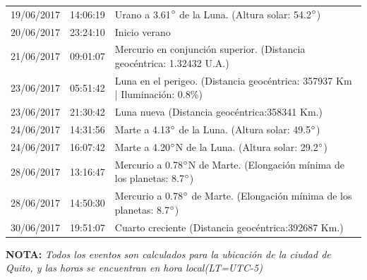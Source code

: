 \documentclass[12pt,a4paper,oneside]{article}
\begin{document}
\begin{center}
\begin{tabular}{ |l| l| l| }
19/06/2017& 14:06:19 &	Urano a 3.61$\degree $ de la Luna. (Altura solar: 54.2$\degree $)	\\
20/06/2017& 23:24:10 &	Inicio verano	\\
21/06/2017& 09:01:07 &	Mercurio en conjunción superior. (Distancia geocéntrica: 1.32432 U.A.)	\\
23/06/2017& 05:51:42 &	Luna en el perigeo. (Distancia geocéntrica: 357937 Km | Iluminación: 0.8\%)	\\
23/06/2017& 21:30:42 &	Luna nueva (Distancia geocéntrica:358341 Km.)	\\
24/06/2017& 14:31:56 &	Marte a 4.13$\degree $ de la Luna. (Altura solar: 49.5$\degree $)	\\
24/06/2017& 16:07:42 &	Marte a 4.20$\degree $N de la Luna. (Altura solar: 29.2$\degree $)	\\
28/06/2017& 13:16:47 &	Mercurio a 0.78$\degree $N de Marte. (Elongación mínima de los planetas: 8.7$\degree $)	\\
28/06/2017& 14:50:30 &	Mercurio a 0.78$\degree $ de Marte. (Elongación mínima de los planetas: 8.7$\degree $)	\\
30/06/2017& 19:51:07 &	Cuarto creciente (Distancia geocéntrica:392687 Km.)	\\
\hline
\end{tabular}
\end{center}
\vspace{1cm}
\textbf{NOTA:  }\textit{Todos los eventos son calculados para la ubicaci\'on de la ciudad de Quito, y las horas se encuentran en hora local(LT=UTC-5)}
\vspace{0.7cm}
\newpage
\end{document}
